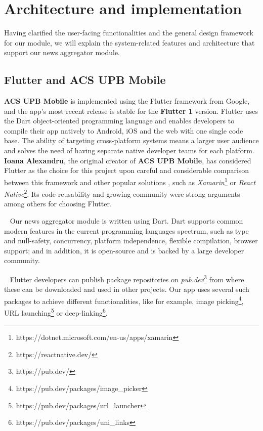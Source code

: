 \chapter{Architecture and implementation} \label{chapter5}

Having clarified the user-facing functionalities and the general design framework for our module, we will explain the system-related features and architecture that support our news aggregator module.

\section{Flutter and ACS UPB Mobile}

\textbf{ACS UPB Mobile} is implemented using the Flutter framework from Google, and the app's most recent release is stable for the \textbf{Flutter 1} version. Flutter uses the Dart object-oriented programming language and enables developers to compile their app natively to Android, iOS and the web with one single code base. The ability of targeting cross-platform systems means a larger user audience and solves the need of having separate native developer teams for each platform. \textbf{Ioana Alexandru}, the original creator of \textbf{ACS UPB Mobile}, has considered Flutter as the choice for this project upon careful and considerable comparison between this framework and other popular solutions \cite{ioana-alexandru-flutter-choice}, such as \textit{Xamarin}\footnote{https://dotnet.microsoft.com/en-us/apps/xamarin} or \textit{React Native}\footnote{https://reactnative.dev/}. Its code reusability and growing community were strong arguments among others for choosing Flutter.

~
Our news aggregator module is written using Dart. Dart supports common modern features in the current programming languages spectrum, such as type and null-safety, concurrency, platform independence, flexible compilation, browser support; and in addition, it is open-source and is backed by a large developer community.

~
Flutter developers can publish package repositories on \textit{pub.dev}\footnote{https://pub.dev/} from where these can be downloaded and used in other projects. Our app uses several such packages to achieve different functionalities, like for example, image picking\footnote{https://pub.dev/packages/image\_picker}, URL launching\footnote{https://pub.dev/packages/url\_launcher} or deep-linking\footnote{https://pub.dev/packages/uni\_links}.

